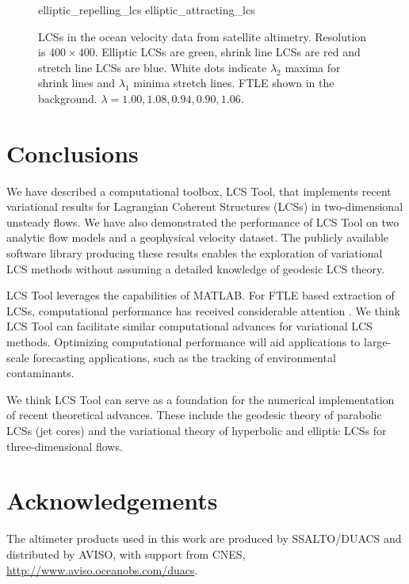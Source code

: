 \documentclass{article}
\newlength\figurewidth
\begin{document}
\begin{figure}
\begin{center}
\setlength{}
{elliptic_repelling_lcs}
{elliptic_attracting_lcs}
\end{center}
\caption{
LCSs in the ocean velocity data from satellite altimetry.
Resolution is $400 \times 400$.
Elliptic LCSs are green, shrink line LCSs are red and stretch line LCSs are blue.
White dots indicate $\lambda_2$ maxima for shrink lines and $\lambda_1$ minima stretch lines.
FTLE shown in the background.
$\lambda = 1.00, 1.08, 0.94, 0.90, 1.06$.
}
\label{f:ocean dataset LCS}
\end{figure}

\section{Conclusions}

We have described a computational toolbox, LCS Tool, that implements recent variational results for Lagrangian Coherent Structures (LCSs) in two-dimensional unsteady flows.
We have also demonstrated the performance of LCS Tool on two analytic flow models and a geophysical velocity dataset.
The publicly available software library producing these results enables the exploration of variational LCS methods without assuming a detailed knowledge of geodesic LCS theory.

LCS Tool leverages the capabilities of MATLAB. For FTLE based extraction of LCSs, computational performance has received considerable attention \parencite{conti12:_gpu_apu_finit_time_lyapun_expon,miron12:_anisot_lagran_coher_struc}.
We think LCS Tool can facilitate similar computational advances for variational LCS methods.
Optimizing computational performance will aid applications to large-scale forecasting applications, such as the tracking of environmental contaminants\parencite{olascoaga12:_forec}.

We think LCS Tool can serve as a foundation for the numerical implementation of recent theoretical advances.
These include the geodesic theory of parabolic LCSs (jet cores)\parencite{farazmand14:_shearless} and the variational theory of hyperbolic and elliptic LCSs for three-dimensional flows\parencite{blazevski14:_hyper_ellip_trans_barrier_three}.

\section*{Acknowledgements}

The altimeter products used in this work are produced by SSALTO/DUACS and distributed by AVISO, with support from CNES, \url{http://www.aviso.oceanobs.com/duacs}.

\printbibliography
\end{document}
